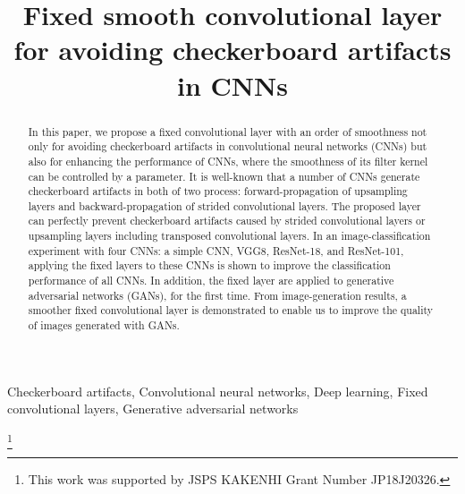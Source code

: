 \documentclass{article}
\title{Fixed smooth convolutional layer for avoiding checkerboard artifacts in CNNs}
\newcounter{num}
\begin{document}
\sloppy
\setlength{\parskip}{0.0pt}
\setlength{\tabcolsep}{1.0pt}
\setlength{\textfloatsep}{0.0pt}
\setlength{\floatsep}{1.0pt}
\setlength{\intextsep}{0.0pt}
\setlength{\abovecaptionskip}{0.0pt}
\setlength{\belowcaptionskip}{2.0pt}
\setlength{\dblfloatsep}{0.0pt}
\setlength{\dbltextfloatsep}{1.0pt}
\setlength{\lineskiplimit}{0.0pt}
\setlength{\lineskip}{0.0pt}
\setlength{\abovedisplayskip}{0.0pt}
\setlength{\belowdisplayskip}{0.0pt}
\setlength{\abovedisplayshortskip}{0.0pt}
\setlength{\belowdisplayshortskip}{0.0pt}
\ninept
\maketitle
\begin{abstract}
  In this paper, we propose a fixed convolutional layer
  with an order of smoothness not only for avoiding
  checkerboard artifacts in convolutional neural networks (CNNs)
  but also for enhancing the performance of CNNs,
  where the smoothness of its filter kernel can be controlled
  by a parameter.
  It is well-known that a number of CNNs generate checkerboard artifacts
  in both of two process: forward-propagation of upsampling layers
  and backward-propagation of strided convolutional layers.
  The proposed layer can perfectly prevent checkerboard artifacts
  caused by strided convolutional layers or upsampling layers
  including transposed convolutional layers.
  In an image-classification experiment with four CNNs:
  a simple CNN, VGG8, ResNet-18, and ResNet-101,
  applying the fixed layers to these CNNs is shown to
  improve the classification performance of all CNNs.
  In addition, the fixed layer are applied to
  generative adversarial networks (GANs), for the first time.
  From image-generation results,
  a smoother fixed convolutional layer is demonstrated to enable us
  to improve the quality of images generated with GANs.
\end{abstract}
\begin{keywords}
  Checkerboard artifacts, Convolutional neural networks, Deep learning,
  Fixed convolutional layers, Generative adversarial networks
\end{keywords}
\renewcommand{\thefootnote}{\fnsymbol{footnote}}
\footnote[0]{This work was supported by JSPS KAKENHI Grant Number JP18J20326.}
\renewcommand{\thefootnote}{\arabic{footnote}}
\end{document}
